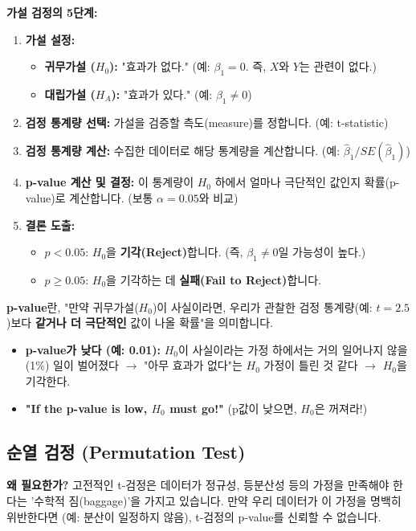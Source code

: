 \documentclass[11pt,a4paper]{book}
\theoremstyle{definition}
\begin{document}
\textbf{가설 검정의 5단계:}
\begin{enumerate}
    \item \textbf{가설 설정:}
        \begin{itemize}
            \item \textbf{귀무가설 ($H_0$):} "효과가 없다." (예: $\beta_1 = 0$. 즉, $X$와 $Y$는 관련이 없다.)
            \item \textbf{대립가설 ($H_A$):} "효과가 있다." (예: $\beta_1 \neq 0$)
        \end{itemize}
    \item \textbf{검정 통계량 선택:} 가설을 검증할 측도(measure)를 정합니다. (예: t-statistic)
    \item \textbf{검정 통계량 계산:} 수집한 데이터로 해당 통계량을 계산합니다. (예: $\hat{\beta}_1 / SE(\hat{\beta}_1)$)
    \item \textbf{p-value 계산 및 결정:} 이 통계량이 $H_0$ 하에서 얼마나 극단적인 값인지 확률(p-value)로 계산합니다. (보통 $\alpha = 0.05$와 비교)
    \item \textbf{결론 도출:}
        \begin{itemize}
            \item $p < 0.05$: $H_0$을 \textbf{기각(Reject)}합니다. (즉, $\beta_1 \neq 0$일 가능성이 높다.)
            \item $p \ge 0.05$: $H_0$을 기각하는 데 \textbf{실패(Fail to Reject)}합니다.
        \end{itemize}
\end{enumerate}

\begin{keyconcept}[title={p-value란 무엇인가?}]
\textbf{p-value}란, "만약 귀무가설($H_0$)이 사실이라면, 우리가 관찰한 검정 통계량(예: $t=2.5$)보다 \textbf{같거나 더 극단적인} 값이 나올 확률"을 의미합니다.

\begin{itemize}
    \item \textbf{p-value가 낮다 (예: 0.01):} $H_0$이 사실이라는 가정 하에서는 거의 일어나지 않을(1\%) 일이 벌어졌다 $\rightarrow$ "아무 효과가 없다"는 $H_0$ 가정이 틀린 것 같다 $\rightarrow$ $H_0$을 기각한다.
    \item \textbf{"If the p-value is low, $H_0$ must go!"} (p값이 낮으면, $H_0$은 꺼져라!)
\end{itemize}
\end{keyconcept}

\subsection{순열 검정 (Permutation Test)}
\textbf{왜 필요한가?}
고전적인 t-검정은 데이터가 정규성, 등분산성 등의 가정을 만족해야 한다는 '수학적 짐(baggage)'을 가지고 있습니다. 만약 우리 데이터가 이 가정을 명백히 위반한다면 (예: 분산이 일정하지 않음), t-검정의 p-value를 신뢰할 수 없습니다.
\end{document}
